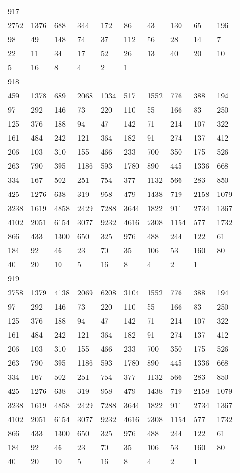 \begin{longtable}{*{10}{l}}
917&&&&&&&&&\\
2752& 1376& 688& 344& 172& 86& 43& 130& 65& 196\\
98& 49& 148& 74& 37& 112& 56& 28& 14& 7\\
22& 11& 34& 17& 52& 26& 13& 40& 20& 10\\
5& 16& 8& 4& 2& 1& \\

918&&&&&&&&&\\
459& 1378& 689& 2068& 1034& 517& 1552& 776& 388& 194\\
97& 292& 146& 73& 220& 110& 55& 166& 83& 250\\
125& 376& 188& 94& 47& 142& 71& 214& 107& 322\\
161& 484& 242& 121& 364& 182& 91& 274& 137& 412\\
206& 103& 310& 155& 466& 233& 700& 350& 175& 526\\
263& 790& 395& 1186& 593& 1780& 890& 445& 1336& 668\\
334& 167& 502& 251& 754& 377& 1132& 566& 283& 850\\
425& 1276& 638& 319& 958& 479& 1438& 719& 2158& 1079\\
3238& 1619& 4858& 2429& 7288& 3644& 1822& 911& 2734& 1367\\
4102& 2051& 6154& 3077& 9232& 4616& 2308& 1154& 577& 1732\\
866& 433& 1300& 650& 325& 976& 488& 244& 122& 61\\
184& 92& 46& 23& 70& 35& 106& 53& 160& 80\\
40& 20& 10& 5& 16& 8& 4& 2& 1& \\

919&&&&&&&&&\\
2758& 1379& 4138& 2069& 6208& 3104& 1552& 776& 388& 194\\
97& 292& 146& 73& 220& 110& 55& 166& 83& 250\\
125& 376& 188& 94& 47& 142& 71& 214& 107& 322\\
161& 484& 242& 121& 364& 182& 91& 274& 137& 412\\
206& 103& 310& 155& 466& 233& 700& 350& 175& 526\\
263& 790& 395& 1186& 593& 1780& 890& 445& 1336& 668\\
334& 167& 502& 251& 754& 377& 1132& 566& 283& 850\\
425& 1276& 638& 319& 958& 479& 1438& 719& 2158& 1079\\
3238& 1619& 4858& 2429& 7288& 3644& 1822& 911& 2734& 1367\\
4102& 2051& 6154& 3077& 9232& 4616& 2308& 1154& 577& 1732\\
866& 433& 1300& 650& 325& 976& 488& 244& 122& 61\\
184& 92& 46& 23& 70& 35& 106& 53& 160& 80\\
40& 20& 10& 5& 16& 8& 4& 2& 1& \\


\end{longtable}
